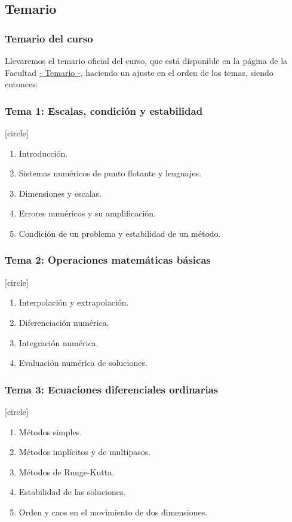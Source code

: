 \subsection{Temario}
\begin{frame}
\frametitle{Temario del curso}
Llevaremos el temario oficial del curso, que está disponible en la página de la Facultad \href{http://www.fciencias.unam.mx/asignaturas/715.pdf}{- Temario -}, haciendo un ajuste en el orden de los temas, siendo entonces:
\end{frame}
\begin{frame}
\frametitle{\textbf{Tema 1: Escalas, condición y estabilidad}}
[circle]
\begin{enumerate}[<+->]
\item Introducción.
\item Sistemas numéricos de punto flotante y lenguajes.
\item Dimensiones y escalas.
\item Errores numéricos y su amplificación.
\item Condición de un problema y estabilidad de un método.
\end{enumerate}
\end{frame}
\begin{frame}
\frametitle{\textbf{Tema 2: Operaciones matemáticas básicas}}
[circle]
\begin{enumerate}[<+->]
\item Interpolación y extrapolación.
\item Diferenciación numérica.
\item Integración numérica.
\item Evaluación numérica de soluciones.
\end{enumerate}
\end{frame}
\begin{frame}
\frametitle{\textbf{Tema 3: Ecuaciones diferenciales ordinarias}}
[circle]
\begin{enumerate}[<+->]
\item Métodos simples.
\item Métodos implícitos y de multipasos.
\item Métodos de Runge-Kutta.
\item Estabilidad de las soluciones.
\item Orden y caos en el movimiento de dos dimensiones.
\end{enumerate}
\end{frame}
